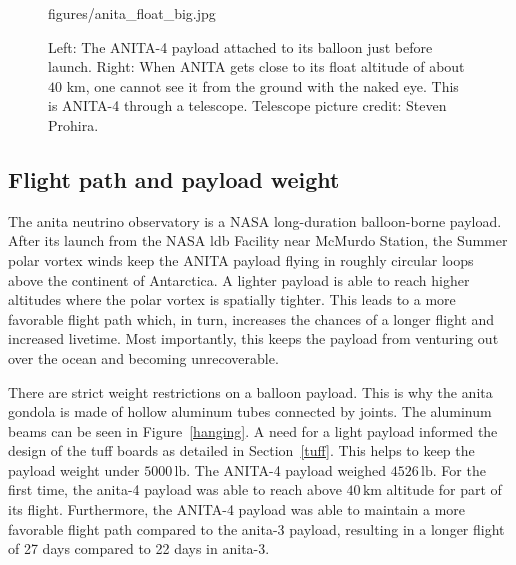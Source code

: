 \begin{figure}
{	{figures/anita_float_big.jpg}
	\label{anita_float_big}
}
\caption{Left: The ANITA-4 payload attached to its balloon just before launch. Right: When ANITA gets close to its float altitude of about $40$ km, one cannot see it from the ground with the naked eye. This is ANITA-4 through a telescope. Telescope picture credit: Steven Prohira.}
\label{launch_float}
\end{figure}

\subsection{Flight path and payload weight}

The \gls{anita} neutrino observatory is a NASA long-duration balloon-borne payload.
After its launch from the NASA \gls{ldb} Facility near McMurdo Station,
the Summer polar vortex winds keep the ANITA payload flying in roughly circular loops above the continent of Antarctica. 
A lighter payload is able to reach higher altitudes where the polar vortex is spatially tighter. 
This leads to a more favorable flight path which, in turn, increases the chances of a longer flight and increased livetime. 
Most importantly, this 
keeps the payload from 
venturing out over the ocean and becoming unrecoverable. 

There are strict weight restrictions on a balloon payload. 
This is why
the \gls{anita} gondola is made of hollow aluminum tubes connected by joints. 
The aluminum beams can be seen in Figure~\ref{hanging}. 
A need for a light payload informed the design of the \gls{tuff} boards as detailed
in Section~\ref{tuff}. 
This helps to keep the payload weight under $5000\,\mbox{lb}$. 
The ANITA-4 payload weighed $4526\,\mbox{lb}$. 
For the first time, the \gls{anita}-4 payload was able to reach above $40\,\mbox{km}$ altitude for part of its flight. 
Furthermore, the ANITA-4 payload was able to maintain a more favorable flight path compared to the \gls{anita}-3 payload, resulting in a longer flight of 27 days compared to 22 days in \gls{anita}-3.


